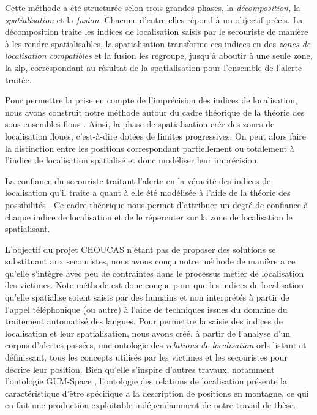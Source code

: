 Cette méthode a été structurée selon trois grandes phases, la
\emph{décomposition,} la \emph{spatialisation} et la \emph{fusion.}
Chacune d'entre elles répond à un objectif précis. La décomposition
traite les indices de localisation saisis par le secouriste de manière
à les rendre spatialisables, la spatialisation transforme ces indices
en des \emph{zones de localisation compatibles} et la fusion les
regroupe, jusqu'à aboutir à une seule zone, la \ac{zlp}, correspondant
au résultat de la spatialisation pour l'ensemble de l'alerte traitée.

Pour permettre la prise en compte de l'imprécision des indices de
localisation, nous avons construit notre méthode autour du cadre
théorique de la théorie des sous-ensembles flous
\autocite{Zadeh1965}. Ainsi, la phase de spatialisation crée des zones
de localisation floues, c'est-à-dire dotées de limites
progressives. On peut alors faire la distinction entre les positions
correspondant partiellement ou totalement à l'indice de localisation
spatialisé et donc modéliser leur imprécision. 

La confiance du secouriste traitant l'alerte en la véracité des
indices de localisation qu'il traite a quant à elle été modélisée à
l'aide de la théorie des possibilités \autocite{Zadeh1978}. Ce cadre
théorique nous permet d'attribuer un degré de confiance à chaque
indice de localisation et de le répercuter sur la zone de localisation
le spatialisant.

L'objectif du projet CHOUCAS n'étant pas de proposer des solutions se
substituant aux secouristes, nous avons conçu notre méthode de manière
a ce qu'elle s'intègre avec peu de contraintes dans le processus
métier de localisation des victimes. Note méthode est donc conçue pour
que les indices de localisation qu'elle spatialise soient saisis par
des humains et non interprétés à partir de l'appel téléphonique (ou
autre) à l'aide de techniques issues du domaine du traitement
automatisé des langues. Pour permettre la saisie des indices de
localisation et leur spatialisation, nous avons créé, à partir de
l'analyse d'un corpus d'alertes passées, une ontologie des
\emph{relations de localisation} \acp{orl} listant et définissant,
tous les concepts utilisés par les victimes et les secouristes pour
décrire leur position. Bien qu'elle s'inspire d'autres travaux,
notamment l'ontologie GUM-Space \autocite{Bateman2010}, l'ontologie
des relations de localisation présente la caractéristique d'être
spécifique a la description de positions en montagne, ce qui en fait
une production exploitable indépendamment de notre travail de thèse.


